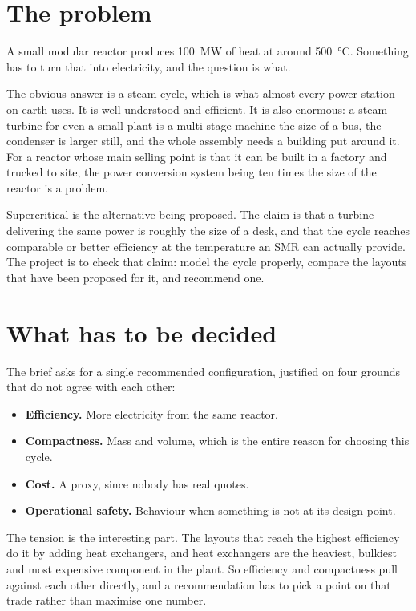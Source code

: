 \documentclass[11pt,a4paper]{report}
\begin{document}
\section{The problem}

A small modular reactor produces \SI{100}{\mega\watt} of heat at around
\SI{500}{\celsius}. Something has to turn that into electricity, and the
question is what.

The obvious answer is a steam cycle, which is what almost every power
station on earth uses. It is well understood and efficient. It is also
enormous: a steam turbine for even a small plant is a multi-stage machine
the size of a bus, the condenser is larger still, and the whole assembly
needs a building put around it. For a reactor whose main selling point is
that it can be built in a factory and trucked to site, the power conversion
system being ten times the size of the reactor is a problem.

Supercritical  is the alternative being proposed. The claim is that
a  turbine delivering the same power is roughly the size of a desk,
and that the cycle reaches comparable or better efficiency at the
temperature an SMR can actually provide. The project is to check that claim:
model the cycle properly, compare the layouts that have been proposed for
it, and recommend one.

\section{What has to be decided}

The brief asks for a single recommended configuration, justified on four
grounds that do not agree with each other:

\begin{itemize}\itemsep2pt
\item \textbf{Efficiency.} More electricity from the same reactor.
\item \textbf{Compactness.} Mass and volume, which is the entire reason for
      choosing this cycle.
\item \textbf{Cost.} A proxy, since nobody has real quotes.
\item \textbf{Operational safety.} Behaviour when something is not at its
      design point.
\end{itemize}

The tension is the interesting part. The layouts that reach the highest
efficiency do it by adding heat exchangers, and heat exchangers are the
heaviest, bulkiest and most expensive component in the plant. So efficiency
and compactness pull against each other directly, and a recommendation has
to pick a point on that trade rather than maximise one number.
\end{document}
